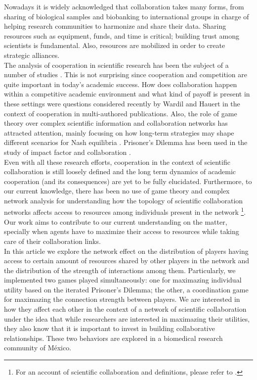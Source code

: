 \documentclass{bmcart}
\begin{document}
Nowadays it is widely acknowledged that collaboration takes many
forms, from sharing of biological samples and biobanking to
international groups in charge of helping research communities to
harmonize and share their data. Sharing resources such as equipment,
funds, and time is critical; building trust among scientists is
fundamental. Also, resources are mobilized in order to create strategic alliances.\\


The analysis of cooperation in scientific research has been the subject of a
number of studies
\cite{VermeulenPenders:2013,Newman:2001,Newman:2004,Elango-etal:2012,HernandezLemus:2013,Strasser:2006,Strasser:2012}. This
is not surprising since cooperation and competition are quite important in
today's academic success. How does collaboration happen within a competitive
academic environment and what kind of payoff is present in these settings were
questions considered recently by Wardil and Hauert \cite{Wardil-etal:2015} in the
context of cooperation in multi-authored publications. Also, the role of game
theory over complex scientific information and collaboration networks has
attracted attention, mainly focusing on how long-term strategies may shape
different scenarios for Nash equilibria \cite{Hanauske-etal:2012}. Prisoner's Dilemma
has been used in the study of impact factor and collaboration
\cite{Hara-etal:2003,LiebermanNowak:2005}. \\  

Even with all these research efforts, cooperation in the context of
scientific collaboration is still loosely defined and the long term
dynamics of academic cooperation (and its consequences) are yet to be
fully elucidated. Furthermore, to our current knowledge, there has
been no use of game theory and complex network analysis for
understanding how the topology of scientific collaboration networks
affects access to resources among individuals present in the network
\footnote{For an account of scientific collaboration and definitions,
  please refer to \cite{Sonnenwald:2007}.}. Our work aims to contribute
to our current understanding on the matter, specially when agents have
to maximize their access to resources while taking care of their collaboration links.\\
  

 In this article we explore the network effect on the distribution
   of players having access to certain amount of resources shared by other players in the
   network and the distribution of the strength of interactions among
   them. Particularly, we implemented two games played simultaneously: 
   one for maximazing individual utility based on the iterated Prisoner's
   Dilemma; the other, a coordination game for maximazing the connection strength between
   players. We are interested in how they affect each other in 
   the context of a network of scientific collaboration under the idea that while
   researchers are interested in maximazing their utilities, they also know that
   it is important to invest in building collaborative relationships. These two
   behaviors are explored in a biomedical research community of M\'exico.\\
\end{document}
